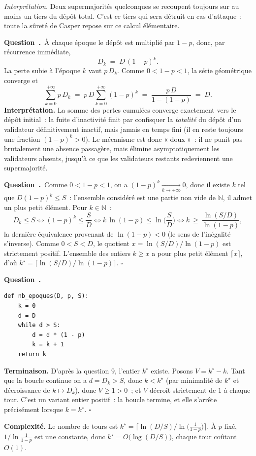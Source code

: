 \documentclass[11pt,a4paper]{article}
\renewcommand{\Q}{\medskip\par\stepcounter{qcnt}\noindent\textbf{\color{cnc}Question~\theqcnt.}~}
\begin{document}
\emph{Interprétation.} Deux supermajorités quelconques se recoupent toujours sur au moins un
tiers du dépôt total. C'est ce tiers qui sera détruit en cas d'attaque~: toute la sûreté de
Casper repose sur ce calcul élémentaire.

\Q À chaque époque le dépôt est multiplié par $1-p$, donc, par récurrence immédiate,
\[ D_k \;=\; D\,(1-p)^k. \]
La perte subie à l'époque $k$ vaut $p\,D_k$. Comme $0<1-p<1$, la série géométrique converge
et
\[ \sum_{k=0}^{+\infty} p\,D_k \;=\; p\,D\sum_{k=0}^{+\infty}(1-p)^k
\;=\; \frac{p\,D}{1-(1-p)} \;=\; D. \]
\textbf{Interprétation.} La somme des pertes cumulées converge exactement vers le dépôt
initial~: la fuite d'inactivité finit par confisquer la \emph{totalité} du dépôt d'un
validateur définitivement inactif, mais jamais en temps fini (il en reste toujours une
fraction $(1-p)^k>0$). Le mécanisme est donc « doux »~: il ne punit pas brutalement une
absence passagère, mais élimine asymptotiquement les validateurs absents, jusqu'à ce que les
validateurs restants redeviennent une supermajorité.

\Q Comme $0<1-p<1$, on a $(1-p)^k\xrightarrow[k\to+\infty]{}0$, donc il existe $k$ tel que
$D(1-p)^k\le S$~: l'ensemble considéré est une partie non vide de $\mathbb{N}$, il admet un
plus petit élément. Pour $k\in\mathbb{N}$~:
\[ D_k\le S \iff (1-p)^k\le \frac{S}{D}
\iff k\,\ln(1-p)\le \ln\!\Big(\frac{S}{D}\Big)
\iff k\ \ge\ \frac{\ln(S/D)}{\ln(1-p)}, \]
la dernière équivalence provenant de $\ln(1-p)<0$ (le sens de l'inégalité s'inverse). Comme
$0<S<D$, le quotient $x=\ln(S/D)/\ln(1-p)$ est strictement positif. L'ensemble des entiers
$k\ge x$ a pour plus petit élément $\lceil x\rceil$, d'où
$k^{\star}=\big\lceil \ln(S/D)/\ln(1-p)\big\rceil$. \hfill$\square$

\Q
\begin{lstlisting}
def nb_epoques(D, p, S):
    k = 0
    d = D
    while d > S:
        d = d * (1 - p)
        k = k + 1
    return k
\end{lstlisting}
\textbf{Terminaison.} D'après la question 9, l'entier $k^{\star}$ existe. Posons
$V = k^{\star}-k$. Tant que la boucle continue on a $d=D_k>S$, donc $k<k^{\star}$ (par
minimalité de $k^{\star}$ et décroissance de $k\mapsto D_k$), donc $V\ge 1>0$~; et $V$
décroît strictement de $1$ à chaque tour. C'est un variant entier positif~: la boucle
termine, et elle s'arrête précisément lorsque $k=k^{\star}$. \hfill$\square$

\textbf{Complexité.} Le nombre de tours est $k^{\star}=\big\lceil
\ln(D/S)/\ln\!\big(\tfrac{1}{1-p}\big)\big\rceil$. À $p$ fixé, $1/\ln\frac{1}{1-p}$ est une
constante, donc $k^\star = O\!\big(\log(D/S)\big)$, chaque tour coûtant $O(1)$.
\end{document}
